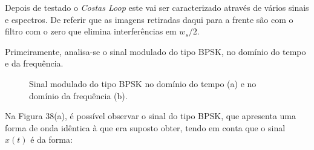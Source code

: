 \documentclass[11pt]{article}
\numberwithin{equation}{section}
\begin{document}
Depois de testado o \textit{Costas Loop} este vai ser caracterizado através de vários sinais e espectros. De referir que as imagens retiradas daqui para a frente são com o filtro com o zero que elimina interferências em $w_{s}/2$. 

Primeiramente, analisa-se o sinal modulado do tipo BPSK, no domínio do tempo e da frequência.

\begin{figure}[H]
	\centering
	\hspace{8mm}
	\vspace{-0.8em}
	\caption{Sinal modulado do tipo BPSK no domínio do tempo (a) e no domínio da frequência (b).}
	\vspace{-0.8em}
\end{figure}

Na Figura 38(a), é possível observar o sinal do tipo BPSK, que apresenta uma forma de onda idêntica à que era suposto obter, tendo em conta que o sinal $x(t)$ é da forma:
\end{document}

